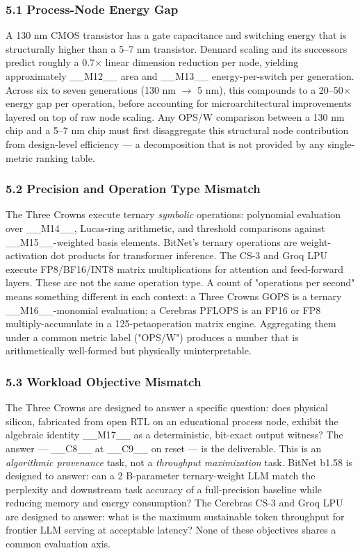 \subsubsection{5.1 Process-Node Energy Gap}

A 130 nm CMOS transistor has a gate capacitance and switching energy that is structurally higher than a 5--7 nm transistor. Dennard scaling and its successors predict roughly a 0.7$\times$ linear dimension reduction per node, yielding approximately \_\_M12\_\_ area and \_\_M13\_\_ energy-per-switch per generation. Across six to seven generations (130 nm $\rightarrow$ 5 nm), this compounds to a 20--50$\times$ energy gap per operation, before accounting for microarchitectural improvements layered on top of raw node scaling. Any OPS/W comparison between a 130 nm chip and a 5--7 nm chip must first disaggregate this structural node contribution from design-level efficiency --- a decomposition that is not provided by any single-metric ranking table.

\subsubsection{5.2 Precision and Operation Type Mismatch}

The Three Crowns execute ternary \textit{symbolic} operations: polynomial evaluation over \_\_M14\_\_, Lucas-ring arithmetic, and threshold comparisons against \_\_M15\_\_-weighted basis elements. BitNet's ternary operations are weight-activation dot products for transformer inference. The CS-3 and Groq LPU execute FP8/BF16/INT8 matrix multiplications for attention and feed-forward layers. These are not the same operation type. A count of "operations per second" means something different in each context: a Three Crowns GOPS is a ternary \_\_M16\_\_-monomial evaluation; a Cerebras PFLOPS is an FP16 or FP8 multiply-accumulate in a 125-petaoperation matrix engine. Aggregating them under a common metric label ("OPS/W") produces a number that is arithmetically well-formed but physically uninterpretable.

\subsubsection{5.3 Workload Objective Mismatch}

The Three Crowns are designed to answer a specific question: does physical silicon, fabricated from open RTL on an educational process node, exhibit the algebraic identity \_\_M17\_\_ as a deterministic, bit-exact output witness? The answer --- \_\_C8\_\_ at \_\_C9\_\_ on reset --- is the deliverable. This is an \textit{algorithmic provenance} task, not a \textit{throughput maximization} task. BitNet b1.58 is designed to answer: can a 2 B-parameter ternary-weight LLM match the perplexity and downstream task accuracy of a full-precision baseline while reducing memory and energy consumption? The Cerebras CS-3 and Groq LPU are designed to answer: what is the maximum sustainable token throughput for frontier LLM serving at acceptable latency? None of these objectives shares a common evaluation axis.

